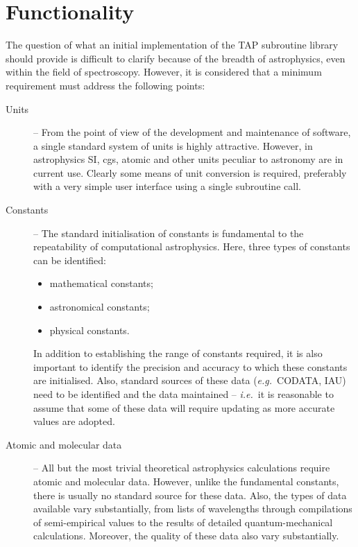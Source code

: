 \section {Functionality}
The question of what an initial implementation of the TAP subroutine library
should provide is difficult to clarify because of the breadth of astrophysics,
even within the field of spectroscopy.
However, it is considered that a minimum requirement must address the
following points:

\begin {description}
\item [Units] -- From the point of view of the development and
maintenance of software, a single standard system of units is highly
attractive.
However, in astrophysics SI, cgs, atomic and other units peculiar to astronomy
are in current use.
Clearly some means of unit conversion is required, preferably with a very
simple user interface using a single subroutine call.

\item [Constants] -- The standard initialisation of constants is fundamental
to the repeatability of computational astrophysics.
Here, three types of constants can be identified:

\begin {itemize}
\item mathematical constants;
\item astronomical constants;
\item physical constants.
\end {itemize}

In addition to establishing the range of constants required, it is also
important to identify the precision and accuracy to which these constants
are initialised.
Also, standard sources of these data ({\em e.g.}\ CODATA, IAU) need to be
identified and the data maintained -- {\em i.e.}\ it is reasonable to assume
that some of these data will require updating as more accurate values are
adopted.

\item [Atomic and molecular data] -- All but the most trivial theoretical
astrophysics calculations require atomic and molecular data.
However, unlike the fundamental constants, there is usually no standard source
for these data.
Also, the types of data available vary substantially, from
lists of wavelengths through compilations of semi-empirical values
to the results of detailed quantum-mechanical calculations.
Moreover, the quality of these data also vary substantially.


\end{description}
